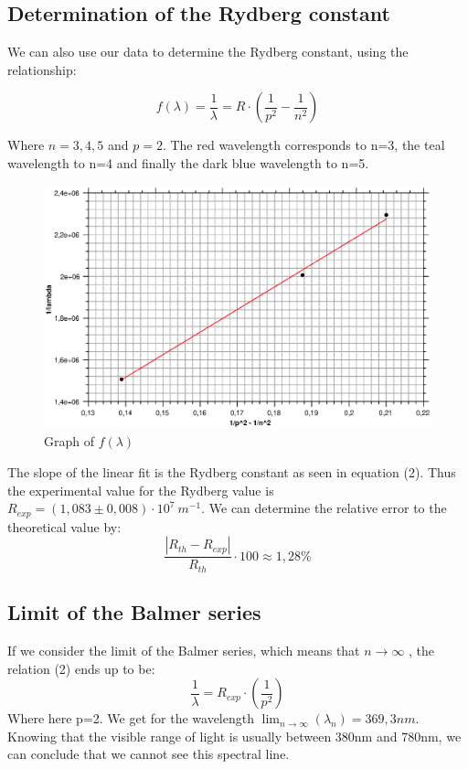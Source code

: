 \documentclass{scrartcl}
\begin{document}
\subsection{Determination of the Rydberg constant}
We can also use our data to determine the Rydberg constant, using the relationship:

\begin{equation}
    f(\lambda) = \frac{1}{\lambda} = R \cdot (\frac{1}{p^2}-\frac{1}{n^2})
\end{equation}

Where $n=3,4,5$ and $p=2$. The red wavelength corresponds to n=3, the teal wavelength to n=4 and finally the dark blue wavelength to n=5.

\begin{figure}[h]
    \centering
    \includegraphics[width=12cm]{TP7_RydbergCst.eps}
    \caption{Graph of $f(\lambda)$}
    \label{fig:my_label}
\end{figure}

\newpage

The slope of the linear fit is the Rydberg constant as seen in equation (2).
Thus the experimental value for the Rydberg value is $R_{exp}= (1,083 \pm 0,008) \cdot 10^7 \ m^{-1}$. We can determine the relative error to the theoretical value by:
\begin{equation}
    \frac{|R_{th}-R_{exp}|}{R_{th}} \cdot 100 \approx 1,28\%
\end{equation}

\subsection{Limit of the Balmer series}
If we consider the limit of the Balmer series, which means that $n\rightarrow \infty$ , the relation (2) ends up to be:
\begin{equation}
    \frac{1}{\lambda} = R_{exp} \cdot (\frac{1}{p^2})
\end{equation}
Where here p=2.
We get for the wavelength $\lim_{n \to \infty}(\lambda_n)=369,3nm$.
Knowing that the visible range of light is usually between 380nm and 780nm, we can conclude that we cannot see this spectral line.
\end{document}
